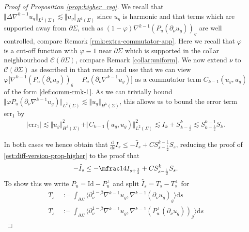 \documentclass[10pt,reqno]{amsart}
\theoremstyle{plain}
\theoremstyle{definition}
\numberwithin{equation}{section}
\newcommand{\Si}{\Sigma}
\newcommand{\vph}{\varphi}
\newcommand{\De}{\Delta}
\newcommand{\norm}[1]{\Vert#1\Vert}
\newcommand{\beq}{\begin{equation}}
\newcommand{\eeq}{\end{equation}}
\newcommand{\beqa}{\begin{equation}\begin{aligned}}
\newcommand{\eeqa}{\end{aligned}\end{equation}}
\newcommand{\half}{\frac{1}{2}}
\newcommand{\dd}{\mathrm{d}} %
\newcommand{\leqs}{\lesssim}
\newcommand{\abs}[1]{\vert#1\vert}
\newcommand{\na}{\nabla}
\newcommand{\Col}{\mathcal C}
\newcommand{\pSi}{{\partial \Sigma}}
\newcommand{\p}{\partial} %
\newcommand{\inner}[2]{\langle #1, #2\rangle} %
\newcommand{\err}{\text{err}}
\begin{document}
\begin{proof}[Proof of Proposition \ref{prop:higher_reg}]
    We recall that
     $\norm{\De\na^{k-1}u_g}_{L^2(\Si)}\leqs\norm{u_g}_{H^k(\Si)} $  since $u_g$ is harmonic and that terms which are supported away from $\pSi$, such as $(1-\varphi) \na^{k-1}(P_u(\p_\nu u_g))_g$ are well controlled, compare Remark \ref{rmk:extra-commutator-app}. 
     Here we recall that $\varphi$ is a cut-off function with $\varphi\equiv 1 $ near $\p\Si$ which is supported in the collar neighbourhood $\Col(\p\Si)$, compare 
     Remark \ref{collar:uniform}. We now extend $\nu$ to  $\Col(\p\Si)$ as described in that remark and use that 
     we can view 
     $\vph \big[ \na^{k-1}(P_u(\p_\nu u_g))_g- P_u(\p_\nu \na^{k-1} u_g)\big]$ as a commutator term $C_{k-1}(u_g,u_g)$ of the form  \eqref{def:comm-rmk-1}. As we can trivially bound $\norm{\vph P_u(\p_\nu \na^{k-1} u_g)}_{L^2(\Si)}\leqs \norm{u_g}_{H^k(\Si)}$, this allows us to bound the error term $\err_1$ by 
    \beqa 
        \abs{\err_1}\leqs  \norm{u_g}_{H^k(\Si)}^2+\norm{C_{k-1}(u_g,u_g)}_{L^2(\Si)}^2\leqs I_k+S_{k-\half}^k\leqs S_{k-\half}^{k-1}S_k.
    \eeqa  

    In both cases we hence obtain that $\tfrac{\dd}{\dd t}I_s\leq- \hat I_s+CS_{s-\half}^{k-1}S_s$, reducing the proof of \eqref{est:diff-version-prop-higher} to the proof that 
    \beq\label{claim:hat-Is}
        -\hat I_s\leq -\mfrac14 I_{s+\half}+C S_{s-\half}^{k} S_{s}.
    \eeq
    To show this we write $P_u=\text{Id}-P_u^\perp$ and split $\hat I_s= T_s-T_s^\perp$ for 
    \beqa\label{est:split-hatIk}
        T_s &:= \int_{\p\Si}\inner{\p_\nu^{1-\beta}\nabla^{k-1} u_g}{\nabla^{k-1} (\p_\nu u_g)_g}\dd s\\ 
        T_s^\perp&:= \int_{\p\Si}\inner{\p_\nu^{1-\beta}\nabla^{k-1} u_g}{\nabla^{k-1}\left(P_u^\perp(\p_\nu u_g)\right)_g}\dd s
    \eeqa


\end{proof}
\end{document}

